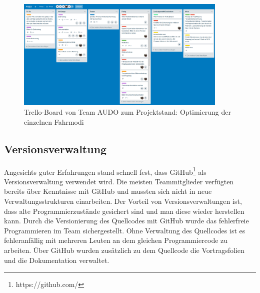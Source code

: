 \begin{figure}[h]
	\centering
	\includegraphics[width=0.9\textwidth]{images/Trello.png}
	\caption{Trello-Board von Team AUDO zum Projektstand: Optimierung der einzelnen Fahrmodi}
	\label{abb:trello-board}
\end{figure}


\subsection{Versionsverwaltung}
\label{sec:versionsverwaltung}
Angesichts guter Erfahrungen stand schnell fest, dass GitHub\footnote{https://github.com/} als Versionsverwaltung verwendet wird. Die meisten Teammitglieder verfügten bereits über Kenntnisse mit GitHub und mussten sich nicht in neue Verwaltungsstrukturen einarbeiten. Der Vorteil von Versionsverwaltungen ist, dass alte Programmierzustände gesichert sind und man diese wieder herstellen kann. Durch die Versionierung des Quellcodes mit GitHub wurde das fehlerfreie Programmieren im Team sichergestellt. Ohne Verwaltung des Quellcodes ist es fehleranfällig  mit mehreren Leuten an dem gleichen Programmiercode zu arbeiten.
Über GitHub wurden zusätzlich zu dem Quellcode die Vortragsfolien und die Dokumentation verwaltet.
